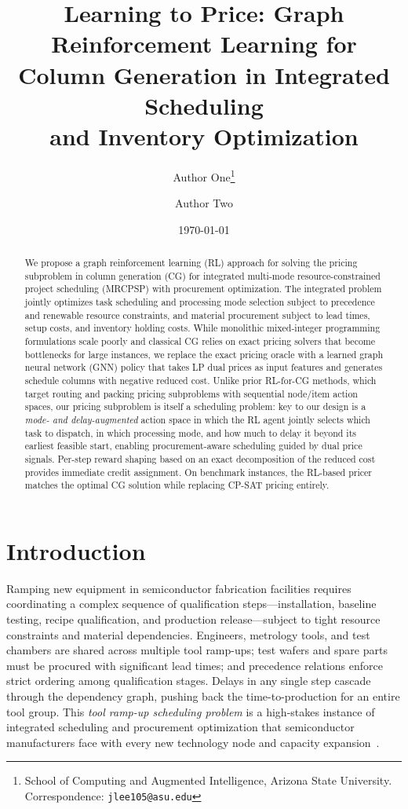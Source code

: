 \documentclass[11pt]{article}
\title{Learning to Price: Graph Reinforcement Learning for\\
Column Generation in Integrated Scheduling\\
and Inventory Optimization}
\author{
  Author One\thanks{School of Computing and Augmented Intelligence, Arizona State University. Correspondence: \texttt{jlee105@asu.edu}} \and
  Author Two
}
\date{\today}
\begin{document}
\maketitle

\begin{abstract}
We propose a graph reinforcement learning (RL) approach for solving the pricing subproblem in column generation (CG) for integrated multi-mode resource-constrained project scheduling (MRCPSP) with procurement optimization.
The integrated problem jointly optimizes task scheduling and processing mode selection subject to precedence and renewable resource constraints, and material procurement subject to lead times, setup costs, and inventory holding costs.
While monolithic mixed-integer programming formulations scale poorly and classical CG relies on exact pricing solvers that become bottlenecks for large instances, we replace the exact pricing oracle with a learned graph neural network (GNN) policy that takes LP dual prices as input features and generates schedule columns with negative reduced cost.
Unlike prior RL-for-CG methods, which target routing and packing pricing subproblems with sequential node/item action spaces, our pricing subproblem is itself a scheduling problem: key to our design is a \emph{mode- and delay-augmented} action space in which the RL agent jointly selects which task to dispatch, in which processing mode, and how much to delay it beyond its earliest feasible start, enabling procurement-aware scheduling guided by dual price signals.
Per-step reward shaping based on an exact decomposition of the reduced cost provides immediate credit assignment.
On benchmark instances, the RL-based pricer matches the optimal CG solution while replacing CP-SAT pricing entirely.
\end{abstract}

\section{Introduction}\label{sec:intro}

Ramping new equipment in semiconductor fabrication facilities requires coordinating a complex sequence of qualification steps---installation, baseline testing, recipe qualification, and production release---subject to tight resource constraints and material dependencies.
Engineers, metrology tools, and test chambers are shared across multiple tool ramp-ups; test wafers and spare parts must be procured with significant lead times; and precedence relations enforce strict ordering among qualification stages.
Delays in any single step cascade through the dependency graph, pushing back the time-to-production for an entire tool group.
This \emph{tool ramp-up scheduling problem} is a high-stakes instance of integrated scheduling and procurement optimization that semiconductor manufacturers face with every new technology node and capacity expansion~\citep{ieee2013semircpsp}.
\end{document}
